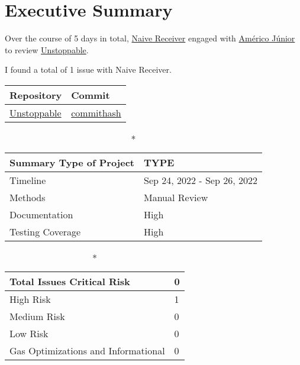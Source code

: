 \hypertarget{executive-summary}{%
\section{Executive Summary}\label{executive-summary}}

Over the course of 5 days in total, \href{https://www.damnvulnerabledefi.xyz/challenges/2.html}{Naive Receiver} engaged with
\href{https://americojunior.com}{Américo Júnior} to review
\href{https://www.damnvulnerabledefi.xyz/challenges/2.html}{Unstoppable}. 

I found a total of 1 issue with Naive Receiver. 

\begin{longtable}[c]{|l|l|}
\hline \textbf{Repository} & \textbf{Commit} \\

\hline
\href{https://www.damnvulnerabledefi.xyz/challenges/2.html}{Unstoppable} &
\href{https://github.com/permalink/commit/commithash}{commithash} \\
\hline
\end{longtable}

\begin{longtable}[]{|l|l|}

\caption*{\textbf{Summary}}
\hline Type of Project & TYPE \\   
\hline Timeline & Sep 24, 2022 - Sep 26, 2022   \\
\hline Methods & Manual Review \\
\hline Documentation & High \\
\hline Testing Coverage & High  \\
\hline
\end{longtable}


\begin{longtable}[]{|l|l|}
\caption*{\textbf{Total Issues}}
\hline Critical Risk & 0 \\
\hline High Risk & 1 \\
\hline Medium Risk & 0 \\ 
\hline Low Risk & 0 \\
\hline Gas Optimizations and Informational & 0 \\
\hline
\end{longtable}

